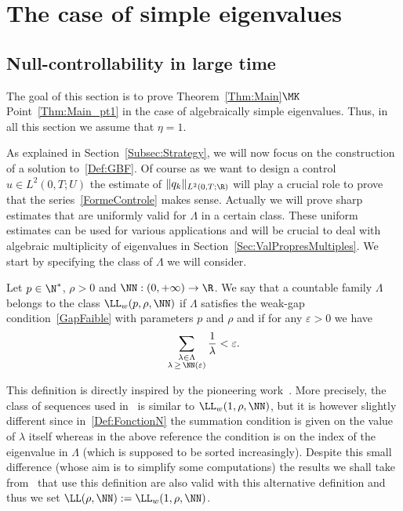 \section{The case of simple eigenvalues}\label{Sec:Simple_Eigenvalues}


\subsection{Null-controllability in large time}\label{Sec:Controlabilite}

The goal of this section is to prove Theorem~\ref{Thm:Main}$\MK$Point~\eqref{Thm:Main_pt1} in the case of algebraically simple eigenvalues. Thus, in all this section we assume that $\eta=1$.

As explained in Section~\ref{Subsec:Strategy}, we will now focus on the construction of a solution to~\eqref{Def:GBF}. Of course as we want to design a control $u \in L^2(0,T ; U)$ the estimate of $\|q_k\|_{L^2(0,T ; \R)}$ will play a crucial role to prove that the series~\eqref{FormeControle} makes sense. Actually we will prove sharp estimates that are uniformly valid for $\Lambda$ in a certain class. These uniform estimates can be used for various applications and will be crucial to deal with algebraic multiplicity of eigenvalues in Section~\ref{Sec:ValPropresMultiples}. We start by specifying the class of $\Lambda$ we will consider.
\begin{defi} \label{Def:Class_L_p_rho_N}
Let $p \in \N^*$, $\rho > 0$ and $\NN : (0,+\infty) \to \R$. We say that a countable family $\Lambda$ belongs to the class $\LL_w(p, \rho, \NN)$ if $\Lambda$ satisfies the weak-gap condition~\eqref{GapFaible} with parameters $p$ and $\rho$ and if for any $\varepsilon >0$ we have
\begin{equation}\label{Def:FonctionN}
\sum_{\substack{\lambda\in \Lambda \\ \lambda \,\geq\,\NN(\varepsilon)}} \frac{1}{\lambda} < \varepsilon.
\end{equation}
\end{defi}

This definition is directly inspired by the pioneering work~\cite{FattoriniRussell74}. More precisely, the class of sequences used in~\cite{FattoriniRussell74} is similar to $\LL_w(1,\rho,\NN)$, but it is however slightly different since in~\eqref{Def:FonctionN} the summation condition is given on the value of $\lambda$ itself whereas in the above reference the condition is on the index of the eigenvalue in $\Lambda$ (which is supposed to be sorted increasingly). Despite this small difference (whose aim is to simplify some computations) the results we shall take from~\cite{FattoriniRussell74} that use this definition are also valid with this alternative definition and thus we set $\LL(\rho,\NN) := \LL_w(1,\rho,\NN)$.

